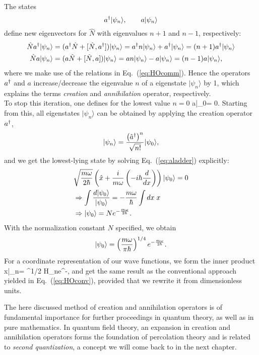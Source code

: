The states 
\[
a^{\dagger} |\psi_n\rangle, \qquad a|\psi_n\rangle
\]
define new eigenvectors for $\hat{N}$ with eigenvalues $n+1$ and $n-1$, respectively:
\begin{align*}
\hat{N}a^{\dagger} |\psi_n\rangle &= (a^{\dagger} \hat{N} + [\hat{N},a^{\dagger}])|\psi_n\rangle = a^{\dagger} n |\psi_n\rangle + a^{\dagger} |\psi_n\rangle = (n+1)a^{\dagger} |\psi_n\rangle \\
\hat{N} a |\psi_n\rangle &= (a\hat{N} + [\hat{N},a])|\psi_n\rangle = an|\psi_n\rangle - a |\psi_n\rangle = (n-1)a |\psi_n\rangle,
\end{align*}
where we make use of the relations in Eq.~(\ref{eq:HOcomm}). Hence the operators $a^{\dagger}$ and $a$ increase/decrease the eigenvalue $n$ of a eigenstate $|\psi_n\rangle$ by 1, which explains the terms \textit{creation} and \textit{annihilation} operator, respectively.\\
To stop this iteration, one defines for the lowest value $n=0$
\be 
a|\psi_0\rangle = 0.
\label{eq:aladder}
\ee
Starting from this, all eigenstates $|\psi_n\rangle$ can be obtained by applying the creation operator $a^{\dagger}$,
\[
|\psi_n\rangle = \frac{\left( \hat{a}^{\dagger} \right)^n}{\sqrt{n!}}|\psi_0\rangle,
\]
and we get the lowest-lying state by solving Eq.~(\ref{eq:aladder}) explicitly:
\begin{align*}
&\sqrt{\frac{m\omega}{2\hbar}}\left( \hat{x} + \frac{i}{m\omega}\left( -i\hbar \frac{d}{dx}\right)\right) |\psi_0\rangle = 0 \\
&\Rightarrow \int \frac{d|\psi_0\rangle}{|\psi_0\rangle} = -\frac{m\omega}{\hbar} \int dx\; x\\
&\Rightarrow |\psi_0\rangle = N e^{-\frac{m\omega}{2\hbar}}.
\end{align*}
With the normalization constant $N$ specified, we obtain
\[
|\psi_0\rangle = \left( \frac{m\omega}{\pi \hbar}\right)^{1/4} e^{-\frac{m\omega}{2\hbar}}.
\]
For a coordinate representation of our wave functions, we form the inner product
\be 
\langle x|\psi_n\rangle = \lb {}\rb^{1/2} H_n\lb{}\rb e^{-},
\label{eq:HOsol}
\ee 
and get the same result as the conventional approach yielded in Eq.~(\ref{eq:HOconv}), provided that we rewrite it from dimensionless units.

The here discussed method of creation and annihilation operators is of fundamental importance for further proceedings in quantum theory, as well as in pure mathematics. In quantum field theory, an expansion in creation and annihilation operators forms the foundation of percolation theory and is related to \textit{second quantization}, a concept we will come back to in the next chapter.

